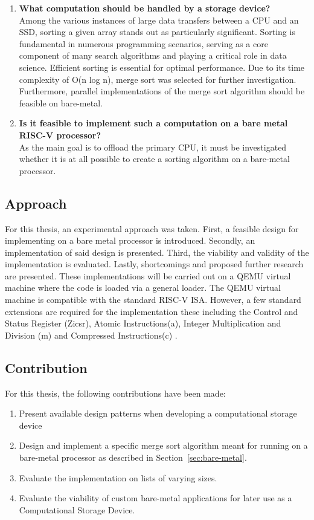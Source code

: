 \begin{enumerate}
  \item {\large \textbf{What computation should be handled by a storage
    device?}}\label{sec:computational} \\
    Among the various instances of large data transfers between a CPU and an SSD,
    sorting a given array stands out as particularly significant. Sorting is
    fundamental in numerous programming scenarios, serving as a core component of
    many search algorithms and playing a critical role in data science. Efficient
    sorting is essential for optimal performance. Due to its time complexity of O(n
    log n), merge sort was selected for further investigation. Furthermore, parallel
    implementations of the merge sort algorithm should be feasible on
    bare-metal.
  \item {\large \textbf{ Is it feasible to implement such a computation on a
    bare metal RISC-V processor?}} \\
    As the main goal is to offload the primary CPU, it must be investigated
    whether it is at all possible to create a sorting algorithm on a bare-metal
    processor.
\end{enumerate}


\subsection{Approach}\label{sec:approach}
For this thesis, an experimental approach was taken. First, a feasible design
for implementing on a bare metal processor is introduced. Secondly, an
implementation of said design is presented. Third, the viability and validity
of the implementation is evaluated. Lastly, shortcomings and proposed further
research are presented. These implementations will be carried out on a QEMU
virtual machine where the code is loaded via a general loader. The QEMU virtual
machine is compatible with the standard RISC-V ISA. However, a few standard
extensions are required for the implementation these including the Control and
Status Register (Zicsr), Atomic Instructions(a), Integer Multiplication and
Division (m) and Compressed Instructions(c) \cite{RISC_priv}.

\subsection{Contribution}
For this thesis, the following contributions have been made:
\begin{enumerate}
  \item Present available design patterns when developing a computational
    storage device
  \item Design and implement a specific merge sort algorithm meant for running on a
    bare-metal processor as described in Section~\ref{sec:bare-metal}.
  \item Evaluate the implementation on lists of varying sizes.
  \item Evaluate the viability of custom bare-metal applications for later use
    as a Computational Storage Device.
\end{enumerate}


